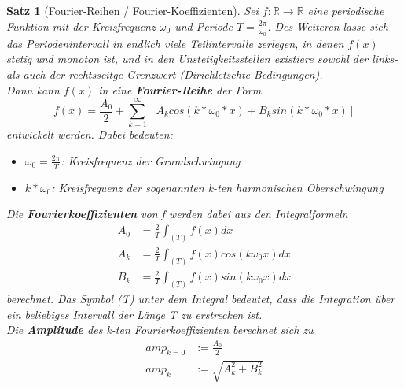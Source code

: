 \documentclass{article}
\theoremstyle{satz}
\newtheorem*{satz}{Satz}
\theoremstyle{definition}
\begin{document}
\theoremstyle{satz}
\begin{tcolorbox}
\begin{satz}[Fourier-Reihen / Fourier-Koeffizienten]
Sei $f: \mathbb{R} \rightarrow \mathbb{R}$ eine periodische Funktion mit der Kreisfrequenz $\omega_0$ und Periode $T = \frac{2 \pi}{\omega_0}$. Des Weiteren lasse sich das Periodenintervall in endlich viele Teilintervalle zerlegen, in denen $f(x)$ stetig und monoton ist, und in den Unstetigkeitsstellen existiere sowohl der links- als auch der rechtsseitge Grenzwert (Dirichletschte Bedingungen).\\
Dann kann $f(x)$ in eine \textbf{Fourier-Reihe} der Form
\begin{equation}
	f(x) = \frac{A_0}{2} + \sum\limits^{\infty}_{k=1} [A_k cos (k * \omega_0 * x) + B_k sin(k * \omega_0 * x)]
\end{equation}
entwickelt werden. Dabei bedeuten:\\
\begin{itemize}
	\item[-] $\omega_0 = \frac{2 \pi}{T}$: Kreisfrequenz der Grundschwingung
	\item[-] $k * \omega_0$: Kreisfrequenz der sogenannten k-ten harmonischen Oberschwingung
\end{itemize}

Die \textbf{Fourierkoeffizienten} von f werden dabei aus den Integralformeln
\begin{equation}
\begin{split}
	A_0 &= \frac{2}{T} \int_{(T)} f(x) dx\\
	A_k &= \frac{2}{T} \int_{(T)} f(x) cos(k \omega_0 x) dx\\
	B_k &= \frac{2}{T} \int_{(T)} f(x) sin(k \omega_0 x) dx
\end{split}
\end{equation}
berechnet. Das Symbol (T) unter dem Integral bedeutet, dass die Integration über ein beliebiges Intervall der Länge T zu erstrecken ist.\\
Die \textbf{Amplitude} des k-ten Fourierkoeffizienten berechnet sich zu
\begin{equation}
\begin{split}
	amp_{k=0} &:= \frac{A_0}{2}\\
	amp_k &:= \sqrt{A^2_k + B^2_k}
\end{split}
\end{equation}
\end{satz}
\end{tcolorbox}
\end{document}
